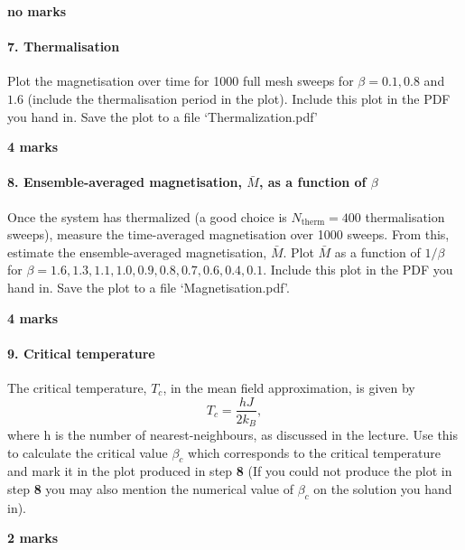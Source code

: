 \documentclass[11pt]{article}
\begin{document}
\textbf{no marks}

    \hypertarget{thermalisation}{%
\paragraph{7. Thermalisation}\label{thermalisation}}

Plot the magnetisation over time for 1000 full mesh sweeps for
\(\beta = 0.1, 0.8\) and \(1.6\) (include the thermalisation period in
the plot). Include this plot in the PDF you hand in. Save the plot to a
file `Thermalization.pdf'

\textbf{4 marks}

    \hypertarget{ensemble-averaged-magnetisation-bar-m-as-a-function-of-beta}{%
\paragraph{\texorpdfstring{8. Ensemble-averaged magnetisation,
\(\bar M\), as a function of
\(\beta\)}{8. Ensemble-averaged magnetisation, \textbackslash{}bar M, as a function of \textbackslash{}beta}}\label{ensemble-averaged-magnetisation-bar-m-as-a-function-of-beta}}

Once the system has thermalized (a good choice is
\(N_\mathrm{therm} =400\) thermalisation sweeps), measure the
time-averaged magnetisation over 1000 sweeps. From this, estimate the
ensemble-averaged magnetisation, \(\bar M\). Plot \(\bar M\) as a
function of \(1/\beta\) for
\(\beta = 1.6, 1.3, 1.1, 1.0, 0.9, 0.8, 0.7, 0.6, 0.4, 0.1\). Include
this plot in the PDF you hand in. Save the plot to a file
`Magnetisation.pdf'.

\textbf{4 marks}

    \hypertarget{critical-temperature}{%
\paragraph{9. Critical temperature}\label{critical-temperature}}

The critical temperature, \(T_c\), in the mean field approximation, is
given by \[
T_c=\frac{h J}{2k_B},
\] where h is the number of nearest-neighbours, as discussed in the
lecture. Use this to calculate the critical value \(\beta_c\) which
corresponds to the critical temperature and mark it in the plot produced
in step \textbf{8} (If you could not produce the plot in step \textbf{8}
you may also mention the numerical value of \(\beta_c\) on the solution
you hand in).

\textbf{2 marks}
\end{document}
